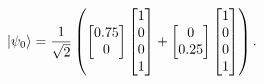 \begin{equation}
  \ket{\psi_0} = \frac{1}{\sqrt{2}}\left(
      \begin{bmatrix} \num{0.75} \\ 0 \end{bmatrix}
      \begin{bmatrix} 1 \\ 0 \\ 0 \\ 1 \end{bmatrix} +
      \begin{bmatrix} 0 \\ \num{0.25} \end{bmatrix}
      \begin{bmatrix} 1 \\ 0 \\ 0 \\ 1 \end{bmatrix}\right).
  \end{equation}

